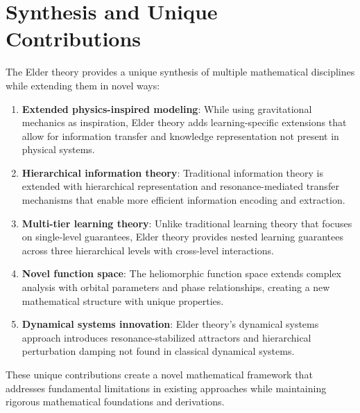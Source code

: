 \section{Synthesis and Unique Contributions}

The Elder theory provides a unique synthesis of multiple mathematical disciplines while extending them in novel ways:

\begin{enumerate}
    \item \textbf{Extended physics-inspired modeling}: While using gravitational mechanics as inspiration, Elder theory adds learning-specific extensions that allow for information transfer and knowledge representation not present in physical systems.
    
    \item \textbf{Hierarchical information theory}: Traditional information theory is extended with hierarchical representation and resonance-mediated transfer mechanisms that enable more efficient information encoding and extraction.
    
    \item \textbf{Multi-tier learning theory}: Unlike traditional learning theory that focuses on single-level guarantees, Elder theory provides nested learning guarantees across three hierarchical levels with cross-level interactions.
    
    \item \textbf{Novel function space}: The heliomorphic function space extends complex analysis with orbital parameters and phase relationships, creating a new mathematical structure with unique properties.
    
    \item \textbf{Dynamical systems innovation}: Elder theory's dynamical systems approach introduces resonance-stabilized attractors and hierarchical perturbation damping not found in classical dynamical systems.
\end{enumerate}

These unique contributions create a novel mathematical framework that addresses fundamental limitations in existing approaches while maintaining rigorous mathematical foundations and derivations.